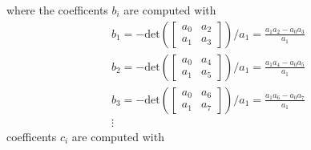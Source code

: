 \documentclass[twoside]{article}
\begin{document}
where the coefficents $b_i$ are computed with
%
\begin{align*}
 b_1 = - \mathrm{det}\left( \left[ \begin{array}{cc} a_0 & a_2 \\ a_1
                                                         &
                                                           a_3 \end{array}
                                                           \right]
                                                           \right) / a_1
=
\frac{a_1 a_2 - a_0 a_3 }{a_1}
\\
b_2 = - \mathrm{det}\left( \left[ \begin{array}{cc} a_0 & a_4 \\ a_1
                                                         &
                                                           a_5 \end{array}
                                                           \right]
                                                           \right) / a_1
=
\frac{a_1 a_4 - a_0 a_5 }{a_1}
\\
b_3 = - \mathrm{det}\left( \left[ \begin{array}{cc} a_0 & a_6 \\ a_1
                                                         &
                                                           a_7 \end{array}
                                                           \right]
                                                           \right) / a_1
=
\frac{a_1 a_6 - a_0 a_7 }{a_1}
\\
\vdots
\end{align*}  
%
coefficents $c_i$ are computed with
%
%
\end{document}
